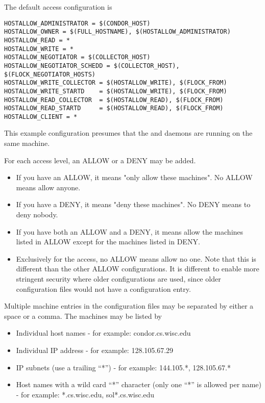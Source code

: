 The default access configuration is
\footnotesize
\begin{verbatim}
HOSTALLOW_ADMINISTRATOR = $(CONDOR_HOST)
HOSTALLOW_OWNER = $(FULL_HOSTNAME), $(HOSTALLOW_ADMINISTRATOR)
HOSTALLOW_READ = *
HOSTALLOW_WRITE = *
HOSTALLOW_NEGOTIATOR = $(COLLECTOR_HOST)
HOSTALLOW_NEGOTIATOR_SCHEDD = $(COLLECTOR_HOST), $(FLOCK_NEGOTIATOR_HOSTS)
HOSTALLOW_WRITE_COLLECTOR = $(HOSTALLOW_WRITE), $(FLOCK_FROM)
HOSTALLOW_WRITE_STARTD    = $(HOSTALLOW_WRITE), $(FLOCK_FROM)
HOSTALLOW_READ_COLLECTOR  = $(HOSTALLOW_READ), $(FLOCK_FROM)
HOSTALLOW_READ_STARTD     = $(HOSTALLOW_READ), $(FLOCK_FROM)
HOSTALLOW_CLIENT = *
\end{verbatim}
\normalsize

This example configuration presumes that the 
and  daemons are running on the same machine.

For each access level, an ALLOW or a DENY may be added.
\begin{itemize}

\item If you have an ALLOW, it means "only allow these machines".  No
    ALLOW means allow anyone.

\item If you have a DENY, it means "deny these machines".  No DENY
    means to deny nobody.

\item If you have both an ALLOW and a DENY, it means allow the
    machines listed in ALLOW except for the machines listed in DENY.

\item Exclusively for the  access,
    no ALLOW means allow no one.
    Note that this is different than the other ALLOW configurations.
    It is different to enable more stringent security where
    older configurations are used, since
    older configuration files would not have a 
     configuration entry.
\end{itemize}

Multiple machine entries
in the configuration files
may be separated by either a space or a comma.
The machines may be listed by

\begin{itemize}
\item Individual host names - for example: condor.cs.wisc.edu
\item Individual IP address - for example: 128.105.67.29
\item IP subnets (use a trailing ``*'') - for example: 144.105.*, 128.105.67.*
\item Host names with a wild card ``*'' character (only one ``*'' is
    allowed per name) - for example: *.cs.wisc.edu, sol*.cs.wisc.edu
\end{itemize}

